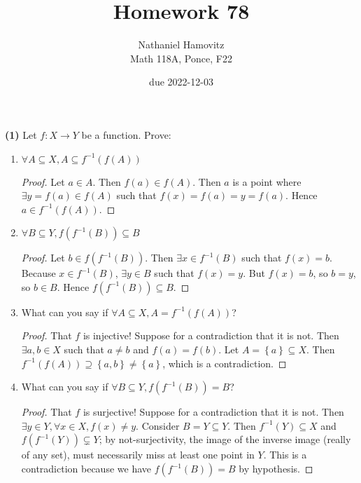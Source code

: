 \documentclass{article}
\newcommand{\set}[1]{\left\{ #1 \right\}}
\begin{document}

\title{Homework 7\/8} %
\author{Nathaniel Hamovitz\\Math 118A, Ponce, F22}
\date{due 2022-12-03}

\maketitle

\textbf{(1) }
Let $f: X \to Y$ be a function. Prove:

\renewcommand{\labelenumi}{(\alph{enumi})}
\begin{enumerate}
    \item 
    $\forall A \subseteq X, A \subseteq f^{-1}(f(A))$
    \begin{proof}
        Let $a \in A$. Then $f(a) \in f(A)$. Then $a$ is a point where $\exists y = f(a) \in f(A)$ such that $f(x) = f(a) = y = f(a)$. %
        Hence $a \in f^{-1}(f(A))$.
    \end{proof}


    \item 
    $\forall B \subseteq Y, f(f^{-1}(B)) \subseteq B$
    \begin{proof}
        Let $b \in f(f^{-1}(B))$. Then $\exists x \in f^{-1}(B)$ such that $f(x) = b$. Because $x \in f^{-1}(B)$, $\exists y \in B$ such that $f(x) = y$. But $f(x) = b$, so $b = y$, so $b \in B$. Hence $f(f^{-1}(B)) \subseteq B$.        
    \end{proof}


    \item 
    What can you say if $\forall A \subseteq X, A = f^{-1}(f(A))$?
    \begin{proof}
        That $f$ is injective! Suppose for a contradiction that it is not. Then $\exists a, b \in X$ such that $a \ne b$ and $f(a) = f(b)$. Let $A = \set{a} \subseteq X$. Then $f^{-1}(f(A)) \supseteq \set{a, b} \ne \set{a}$, which is a contradiction.
        
        
    \end{proof}


    \item 
    What can you say if $\forall B \subseteq Y, f(f^{-1}(B)) = B$?
    \begin{proof}
        That $f$ is surjective! Suppose for a contradiction that it is not. Then $\exists y \in Y, \forall x \in X, f(x) \ne y$. Consider $B = Y \subseteq Y$. Then $f^{-1}(Y) \subseteq X$ and $f(f^{-1}(Y)) \subsetneq Y$; by not-surjectivity, the image of the inverse image (really of any set), must necessarily miss at least one point in $Y$. This is a contradiction because we have $f(f^{-1}(B)) = B$ by hypothesis.
        
    \end{proof}
\end{enumerate}
\end{document}
